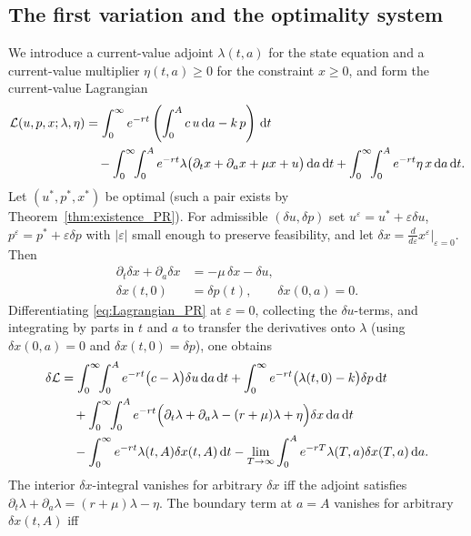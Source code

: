 \documentclass[pdflatex,sn-mathphys-num]{sn-jnl}
\theoremstyle{definition}
\theoremstyle{remark}
\newcommand{\dd}{\,\mathrm{d}}
\begin{document}
\subsection{The first variation and the optimality system}

We introduce a current-value adjoint $\lambda(t,a)$ for the state equation
and a current-value multiplier $\eta(t,a)\ge0$ for the constraint $x\ge0$,
and form the current-value Lagrangian
\begin{align}
\mathcal L(u,p,x;\lambda,\eta)
&=\int_0^\infty e^{-rt}\left(\int_0^A c\,u\dd a-k\,p\right)\dd t
\notag\\
&\quad-\int_0^\infty\!\!\int_0^A e^{-rt}\lambda
\bigl(\partial_t x+\partial_a x+\mu x+u\bigr)\dd a\dd t
+\int_0^\infty\!\!\int_0^A e^{-rt}\eta\,x\dd a\dd t.
\label{eq:Lagrangian_PR}
\end{align}
Let $(u^\ast,p^\ast,x^\ast)$ be optimal (such a pair exists by
Theorem~\ref{thm:existence_PR}). For admissible $(\delta u,\delta p)$ set
$u^\varepsilon=u^\ast+\varepsilon\delta u$,
$p^\varepsilon=p^\ast+\varepsilon\delta p$ with $|\varepsilon|$ small enough
to preserve feasibility, and let
$\delta x=\frac{d}{d\varepsilon}x^\varepsilon|_{\varepsilon=0}$. Then
\begin{align}
\partial_t \delta x+\partial_a \delta x
&=-\mu\,\delta x-\delta u, \label{eq:pf_lin_state}\\
\delta x(t,0)&=\delta p(t),\qquad \delta x(0,a)=0. \label{eq:pf_lin_bc}
\end{align}
Differentiating \eqref{eq:Lagrangian_PR} at $\varepsilon=0$, collecting the
$\delta u$-terms, and integrating by parts in $t$ and $a$ to transfer the
derivatives onto $\lambda$ (using $\delta x(0,a)=0$ and
$\delta x(t,0)=\delta p$), one obtains
\begin{align}
\delta\mathcal L
&=\int_0^\infty\!\!\int_0^A e^{-rt}\bigl(c-\lambda\bigr)\delta u\dd a\dd t
+\int_0^\infty e^{-rt}\bigl(\lambda(t,0)-k\bigr)\delta p\dd t
\notag\\
&\quad+\int_0^\infty\!\!\int_0^A e^{-rt}
\Bigl(\partial_t\lambda+\partial_a\lambda-(r+\mu)\lambda+\eta\Bigr)
\delta x\dd a\dd t
\notag\\
&\quad-\int_0^\infty e^{-rt}\lambda(t,A)\delta x(t,A)\dd t
-\lim_{T\to\infty}\int_0^A e^{-rT}\lambda(T,a)\delta x(T,a)\dd a.
\label{eq:pf_deltaL_3}
\end{align}
The interior $\delta x$-integral vanishes for arbitrary $\delta x$ iff the
adjoint satisfies $\partial_t\lambda+\partial_a\lambda=(r+\mu)\lambda-\eta$.
The boundary term at $a=A$ vanishes for arbitrary $\delta x(t,A)$ iff
\end{document}
